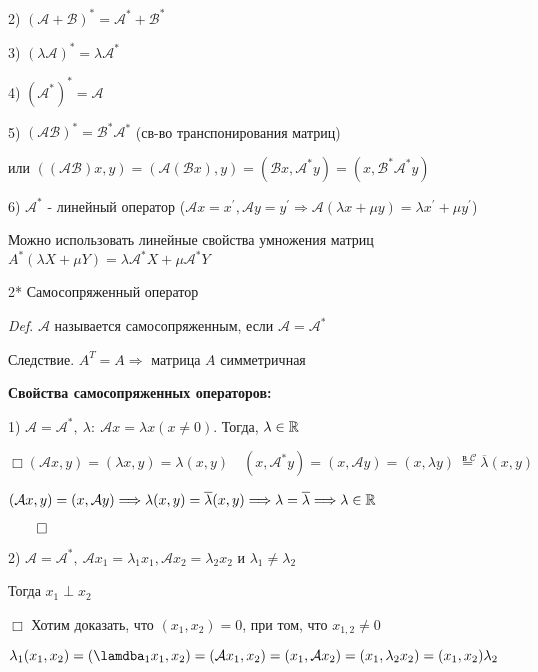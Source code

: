 \documentclass[12pt]{article}
\begin{document}
    2) $(\mathcal{A} + \mathcal{B})^* = \mathcal{A}^* + \mathcal{B}^*$

    3) $(\lambda \mathcal{A})^* = \lambda \mathcal{A}^*$

    4) $(\mathcal{A}^*)^* = \mathcal{A}$

    5) $(\mathcal{A}\mathcal{B})^* = \mathcal{B}^* \mathcal{A}^*$ (св-во транспонирования матриц)

    или $((\mathcal{AB})x, y) = (\mathcal{A}(\mathcal{B}x), y) = (\mathcal{B}x, \mathcal{A}^* y) = (x, \mathcal{B}^* \mathcal{A}^* y)$

    6) $\mathcal{A}^*$ - линейный оператор ($\mathcal{A}x = x^\prime, \mathcal{A}y = y^\prime \Longrightarrow \mathcal{A}(\lambda x + \mu y) = \lambda x^\prime + \mu y^\prime$)

    Можно использовать линейные свойства умножения матриц $A^* (\lambda X + \mu Y) = \lambda \mathcal{A}^* X + \mu \mathcal{A}^* Y$

    2* Самосопряженный оператор

    \vspace{3mm}
\textit{Def}. $\mathcal{A}$ называется самосопряженным, если $\mathcal{A} = \mathcal{A}^*$

    Следствие. $A^T = A \Longrightarrow$ матрица $A$ симметричная

    \vspace{5mm}
    \textbf{
    Свойства самосопряженных операторов:}

    1) $\mathcal{A} = \mathcal{A}^*, \ \lambda : \ \mathcal{A}x = \lambda x (x \neq 0)$. Тогда, $\lambda \in \mathbb{R}$

    $\Box (\mathcal{A}x, y) = (\lambda x, y) = \lambda (x, y) \quad (x, \mathcal{A}^* y) = (x, \mathcal{A}y) = (x, \lambda y) \stackrel{\text{ в } \mathcal{C}}{=} \overline{\lambda} (x, y)$

    $(\mathcal{A}x, y) = (x, \mathcal{A}y) \Longrightarrow \lambda (x, y) = \overline{\lambda} (x, y) \Longrightarrow \lambda = \overline{\lambda} \Longrightarrow \lambda \in \mathbb{R}$

    $\qed$

    2) $\mathcal{A} = \mathcal{A}^*, \ \mathcal{A}x_1 = \lambda_1 x_1, \mathcal{A}x_2 = \lambda_2 x_2$ и $\lambda_1 \neq \lambda_2$

    Тогда $x_1 \perp x_2$

    $\Box$ Хотим доказать, что $(x_1, x_2) = 0$, при том, что $x_{1,2} \neq 0$

    $\lambda_1 (x_1, x_2) = (\lamdba_1 x_1, x_2) = (\mathcal{A} x_1, x_2) = (x_1, \mathcal{A} x_2) = (x_1, \lambda_2 x_2) = (x_1, x_2) \lambda_2$
\end{document}
